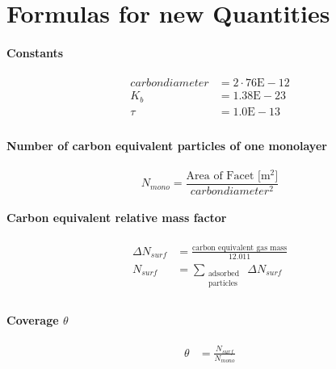 
\chapter{Formulas for new Quantities}\label{chapter:Formulas}

\subsubsection*{Constants}
\begin{equation}
	\begin{split}
	carbondiameter&=2 \cdot 76\text{E}-12\\
	K_b&=1.38\text{E}-23\\
	\tau&=1.0\text{E}-13\\
	\end{split}
\end{equation}

\subsubsection*{Number of carbon equivalent particles of one monolayer}
\begin{equation}
	\label{eq:nmono}
	N_{mono}=\frac{\text{Area of Facet [m$^2$]}}{carbondiameter^2}
\end{equation}

\subsubsection*{Carbon equivalent relative mass factor}
\begin{equation}
	\label{eq:nsurf}
	\begin{split}
	\Delta N_{surf}&=\frac{\text{carbon equivalent gas mass}}{12.011}\\
	N_{surf}&=\sum\limits_{\substack{\text{adsorbed}\\\text{particles}}}\ \Delta N_{surf}\\
	\end{split}
\end{equation}

\subsubsection*{Coverage $\theta$}
\begin{equation}
	\label{eq:cov}
	\begin{split}
		\theta&=\frac{N_{surf}}{N_{mono}}
	\end{split}
\end{equation}

